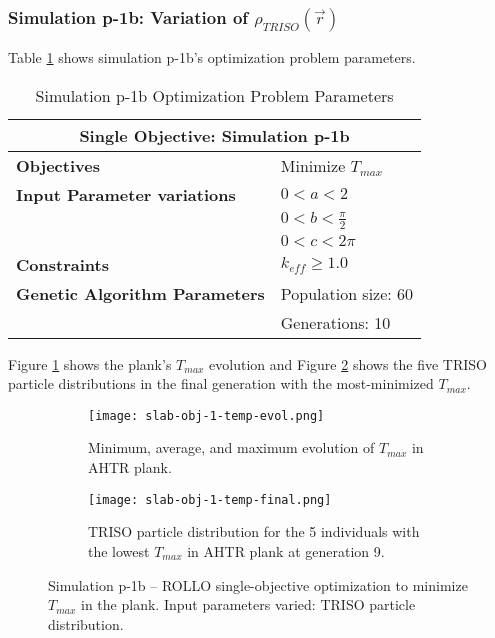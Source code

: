 \subsubsection{Simulation p-1b: Variation of $\rho_{TRISO}(\vec{r})$}
Table \ref{tab:simulationp1b} shows simulation p-1b's optimization problem parameters. 
\begin{table}[htbp]
    \centering
    \onehalfspacing
    \caption{Simulation p-1b Optimization Problem Parameters}
	\label{tab:simulationp1b}
    \footnotesize
    \begin{tabular}{l|p{3cm}}
    \hline 
    \multicolumn{2}{c}{\textbf{Single Objective: Simulation p-1b}} \\
    \hline 
    \textbf{Objectives} & Minimize $T_{max}$ \\
    \hline 
    \textbf{Input Parameter variations} & $0<a<2$ \\
    & $0<b<\frac{\pi}{2}$ \\
    & $0<c<2\pi$ \\
    \hline
    \textbf{Constraints} & $k_{eff} \geq 1.0$\\ 
    \hline 
    \textbf{Genetic Algorithm Parameters} & Population size: 60 \\
    & Generations: 10 \\
    \hline
    \end{tabular}
\end{table}
Figure \ref{fig:slab-obj-1-temp-evol} shows the plank's $T_{max}$ evolution 
and Figure \ref{fig:slab-obj-1-temp-final} shows the five TRISO particle 
distributions in the final generation with the most-minimized $T_{max}$.
\begin{figure}[htbp]
    \centering
    \begin{subfigure}{\textwidth}
        \texttt{[image: slab-obj-1-temp-evol.png]}
        \caption{Minimum, average, and maximum evolution of $T_{max}$ in 
        AHTR plank.}
        \label{fig:slab-obj-1-temp-evol} 
    \end{subfigure}
    \begin{subfigure}{\textwidth}
        \texttt{[image: slab-obj-1-temp-final.png]}
        \caption{TRISO particle distribution for the 5 individuals with the 
        lowest $T_{max}$ in AHTR plank at generation 9.}
        \label{fig:slab-obj-1-temp-final} 
    \end{subfigure}
    \caption{Simulation p-1b -- ROLLO single-objective optimization to minimize $T_{max}$ 
    in the plank. Input parameters varied: TRISO particle distribution.}
    \label{fig:slab-obj-1-temp}
\end{figure}
